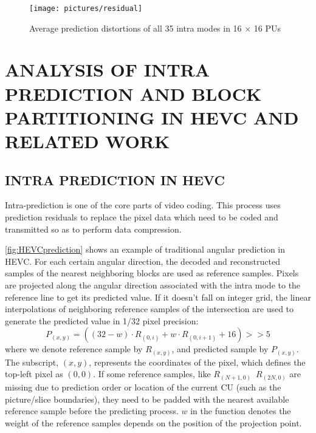 \documentclass[journal]{IEEEtran}
\begin{document}
\begin{figure}[tp]
    \centering
    \texttt{[image: pictures/residual]}
    \caption{Average prediction distortions of all 35 intra modes in 16 × 16 PUs}

    \label{fig:residual}
\end{figure}
\section{ANALYSIS OF INTRA PREDICTION AND BLOCK PARTITIONING IN HEVC AND RELATED WORK}

\subsection{INTRA PREDICTION IN HEVC}
Intra-prediction is one of the core parts of video coding. This process uses prediction residuals to replace the pixel data which need to be coded and transmitted so as to perform data compression.

\autoref{fig:HEVCprediction} shows an example of traditional angular prediction in HEVC. For each certain angular direction, the decoded and reconstructed samples of the nearest neighboring blocks are used as reference samples. Pixels are projected along the angular direction associated with the intra mode to the reference line to get its predicted value. If it doesn't fall on integer grid, the linear interpolations of neighboring reference samples of the intersection are used to generate the predicted value in 1/32 pixel precision:
\begin{equation}
    P_{(x,y)} =((32-w)\cdot R_{(0,i)} +w\cdot R_{(0,i+1)} +16)>>5
\end{equation}
where we denote reference sample by $R_{(x,y)}$, and predicted sample by $P_{(x,y)}$. The subscript, $(x,y)$, represents the coordinates of the pixel, which defines the top-left pixel as $(0,0)$. If some reference samples, like $R_{(N+1,0)}$~$R_{(2N,0)}$ are missing due to prediction order or location of the current CU (such as the picture/slice boundaries), they need to be padded with the nearest available reference sample before the predicting process. $w$ in the function denotes the weight of the reference samples depends on the position of the projection point.
\end{document}
